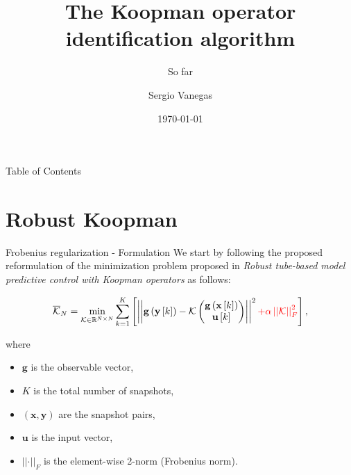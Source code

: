 \documentclass{beamer}
\title[Process]{The Koopman operator identification algorithm}
\subtitle{So far}
\institute[Polimi]{Politecnico di Milano}
\author{Sergio Vanegas}
\date{\today}
\begin{document}
\begin{frame}
    \maketitle
\end{frame}

\begin{frame}{Table of Contents}
    \tableofcontents
\end{frame}


\section{Robust Koopman}

\begin{frame}{Frobenius regularization - Formulation}
    We start by following the proposed reformulation of the minimization problem proposed in \textit{Robust tube-based model predictive control with Koopman operators} as follows:

    \begin{equation*}
        \overline{\mathcal{K}}_N =
        \min_{\mathcal{K} \in \mathbb{R}^{\tilde{N} \times N}}
        \sum_{k=1}^K \left[
            \left|\left|
                \mathbf{g}\left(\mathbf{y}\left[k\right]\right) - 
                \mathcal{K}
                \begin{pmatrix}
                \mathbf{g}\left(\mathbf{x}\left[k\right]\right)
                \\
                \mathbf{u}\left[k\right]
                \end{pmatrix}
            \right|\right|^2
            {
                \color{red}
                + \alpha\left|\left|\mathcal{K}\right|\right|_F^2
            }
        \right],
    \end{equation*}

    where

    \begin{itemize}
        \item $\mathbf{g}$ is the observable vector,
        \item $K$ is the total number of snapshots,
        \item $\left(\mathbf{x},\mathbf{y}\right)$ are the snapshot pairs,
        \item $\mathbf{u}$ is the input vector,
        \item $\left|\left|\cdot\right|\right|_F$ is the element-wise 2-norm (Frobenius norm).
    \end{itemize}
\end{frame}
\end{document}
